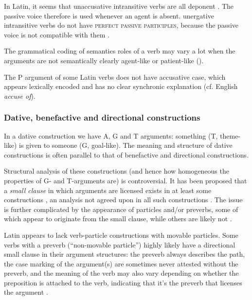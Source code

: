 \documentclass[a4paper, oneside, 12pt]{report}
\newcommand*{\citepages}[1]{pp.~{#1}}
\newcommand{\form}[1]{\emph{#1}}
\newcommand*{\category}[1]{\textsc{#1}}
\begin{document}
In Latin, it seems that unaccusative intransitive verbs are all deponent
\citep[\citepages{308-309}]{oniga2014latin}.
The passive voice therefore is used whenever an agent is absent.
unergative intransitive verbs do not have \category{perfect passive participles},
because the passive voice is not compatible with them
\citep{giusti2019psychological}.

The grammatical coding of semantics roles of a verb may vary a lot 
when the arguments are not semantically clearly agent-like or patient-like
().

The P argument of some Latin verbs does not have accusative case,
which appears lexically encoded and has no clear synchronic explanation
(cf. English \form{accuse of}).

\subsubsection{Dative, benefactive and directional constructions}\label{sec:grammatical.clause.argument.multi-transitive-small-clause}

In a dative construction we have A, G and T arguments:
something (T, theme-like) is given to someone (G, goal-like).
The meaning and structure of dative constructions is often parallel to that of benefactive and directional constructions.

Structural analysis of these constructions (and hence how homogeneous the properties of G- and T-arguments are) is controversial.
It has been proposed that a \emph{small clause} in which arguments are licensed exists in at least some constructions \citep{wurmbrand2000structure,punske2013three},
an analysis not agreed upon in all such constructions \citep{huang2007valence,punske2013three}.
The issue is further complicated by the appearance of particles and/or preverbs,
some of which appear to originate from the small clause,
while others are likely not \citep{farrell2005english,punske2013three,wurmbrand2000structure}.

Latin appears to lack verb-particle constructions with movable particles.
Some verbs with a preverb (``non-movable particle'') highly likely have a directional small clause in their argument structures:
the preverb always describes the path,
the case marking of the argument(s) are sometimes never attested without the preverb,
and the meaning of the verb may also vary depending on whether the preposition is attached to the verb,
indicating that it's the preverb that licenses the argument
\citep{mare2018issues}.
\end{document}
